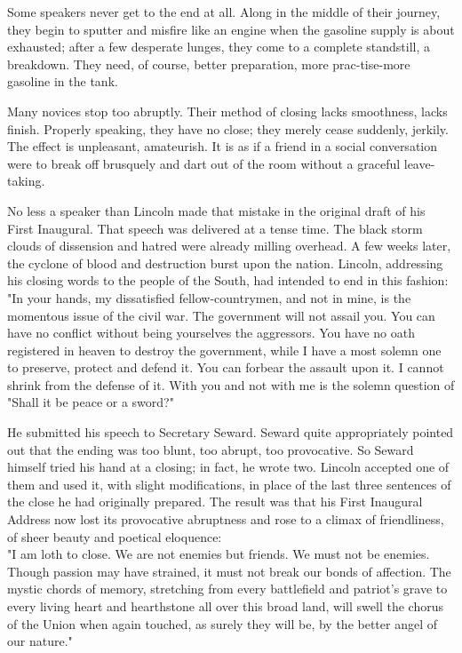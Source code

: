\documentclass[10pt]{article}
\begin{document}
Some speakers never get to the end at all. Along in the middle of their journey, they begin to sputter and misfire like an engine when the gasoline supply is about exhausted; after a few desperate lunges, they come to a complete standstill, a breakdown. They need, of course, better preparation, more prac-tise-more gasoline in the tank.

Many novices stop too abruptly. Their method of closing lacks smoothness, lacks finish. Properly speaking, they have no close; they merely cease suddenly, jerkily. The effect is unpleasant, amateurish. It is as if a friend in a social conversation were to break off brusquely and dart out of the room without a graceful leave-taking.

No less a speaker than Lincoln made that mistake in the original draft of his First Inaugural. That speech was delivered at a tense time. The black storm clouds of dissension and hatred were already milling overhead. A few weeks later, the cyclone of blood and destruction burst upon the nation. Lincoln, addressing his closing words to the people of the South, had intended to end in this fashion:\\
"In your hands, my dissatisfied fellow-countrymen, and not in mine, is the momentous issue of the civil war. The government will not assail you. You can have no conflict without being yourselves the aggressors. You have no oath registered in heaven to destroy the government, while I have a most solemn one to preserve, protect and defend it. You can forbear the assault upon it. I cannot shrink from the defense of it. With you and not with me is the solemn question of "Shall it be peace or a sword?"

He submitted his speech to Secretary Seward. Seward quite appropriately pointed out that the ending was too blunt, too abrupt, too provocative. So Seward himself tried his hand at a closing; in fact, he wrote two. Lincoln accepted one of them and used it, with slight modifications, in place of the last three sentences of the close he had originally prepared. The result was that his First Inaugural Address now lost its provocative abruptness and rose to a climax of friendliness, of sheer beauty and poetical eloquence:\\
"I am loth to close. We are not enemies but friends. We must not be enemies. Though passion may have strained, it must not break our bonds of affection. The mystic chords of memory, stretching from every battlefield and patriot's grave to every living heart and hearthstone all over this broad land, will swell the chorus of the Union when again touched, as surely they will be, by the better angel of our nature."
\end{document}
